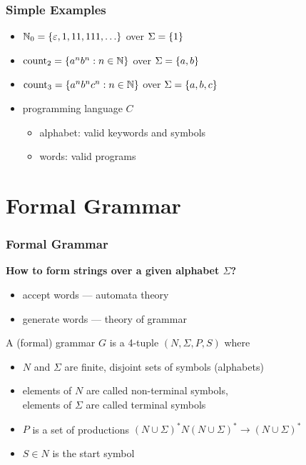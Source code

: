 \documentclass{beamer}
\DeclareMathOperator{\countL}{count}
\begin{document}
	\begin{frame} \frametitle{Simple Examples}
		\begin{itemize}
			\item<+-> $\N_0 = \menge{\epsilon, 1, 11, 111, \dots}$ over $\Sigma = \left\{ 1 \right\}$
			\item<+-> $\countL_2 = \menge{a^n b^n : n \in \N}$ over $\Sigma = \left\{ a,b \right\}$
			\item<+-> $\countL_3 = \menge{a^n b^n c^n : n \in \N}$ over $\Sigma = \left\{ a, b, c \right\}$
			\item<+-> programming language $C$
			\begin{itemize}
				\item alphabet: valid keywords and symbols
				\item words: valid programs
			\end{itemize}
		\end{itemize}
	\end{frame}


	\section{Formal Grammar}
	\begin{frame} \frametitle{Formal Grammar}
		\textbf{How to form strings over a given alphabet $\Sigma$?}
		\pause
		\begin{itemize}
			\item accept words --- automata theory
			\item generate words --- theory of grammar
		\end{itemize}
		
		\pause
		
		\begin{definition}[Grammar]
			A (formal) grammar $G$ is a 4-tuple $(N, \Sigma, P, S)$ where
			\begin{itemize}
				\item $N$ and $\Sigma$ are finite, disjoint sets of symbols (alphabets) 
				\item elements of $N$ are called non-terminal symbols, \\
				elements of $\Sigma$ are called terminal symbols
				\item $P$ is a set of productions $(N \cup \Sigma)^\ast N (N \cup \Sigma)^\ast \to (N \cup \Sigma)^\ast$
				\item $S \in N$ is the start symbol
			\end{itemize}
		\end{definition}
	\end{frame}
\end{document}
